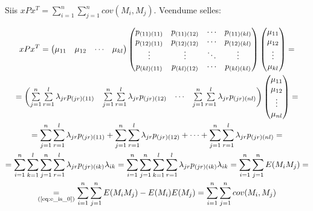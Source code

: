 \documentclass[a4paper,12pt,oneside]{article}
\newenvironment{tightcenter}{%
  \setlength\topsep{0pt}
  \setlength\parskip{0pt}
  \begin{center}
}{%
  \end{center}
}
\numberwithin{equation}{section}
\theoremstyle{definition}
\begin{document}
Siis $xPx^T = \sum \limits_{i=1}^n \sum \limits_{j=1}^n cov(M_i,M_j)$. Veendume selles:
\begin{tightcenter}
\begin{equation*}
\begin{gathered}
xPx^T =
\begin{pmatrix}
\mu_{11} & \mu_{12} & \cdots & \mu_{kl} 
\end{pmatrix}
\begin{pmatrix}
p_{(11)(11)}&p_{(11)(12)}&\cdots&p_{(11)(kl)} \\
p_{(12)(11)}&p_{(12)(12)}&\cdots&p_{(12)(kl)} \\
\vdots&\vdots&\ddots&\vdots \\
p_{(kl)(11)}&p_{(kl)(12)}&\cdots&p_{(kl)(kl)} \\
\end{pmatrix} 
\begin{pmatrix}
\mu_{11} \\
\mu_{12} \\
\vdots \\
\mu_{kl}
\end{pmatrix}
= \\
= 
\begin{pmatrix}
\sum \limits_{j=1}^n \sum \limits_{r=1}^l \lambda_{jr}p_{(jr)(11)} & \sum \limits_{j=1}^n \sum \limits_{r=1}^l \lambda_{jr}p_{(jr)(12)} & \cdots &  \sum \limits_{j=1}^n \sum \limits_{r=1}^l \lambda_{jr}p_{(jr)(nl)} \\
\end{pmatrix}
\begin{pmatrix}
\mu_{11} \\
\mu_{12} \\
\vdots \\
\mu_{nl}
\end{pmatrix}
=\\
=
\sum \limits_{j=1}^n \sum \limits_{r=1}^l \lambda_{jr}p_{(jr)(11)} + \sum \limits_{j=1}^n \sum \limits_{r=1}^l \lambda_{jr}p_{(jr)(12)} + \cdots +  \sum \limits_{j=1}^n \sum \limits_{r=1}^l \lambda_{jr}p_{(jr)(nl)}=\\
= \sum \limits_{i=1}^{n} \sum \limits_{k=1}^{l} \sum \limits_{j=1}^n \sum \limits_{r=1}^l \lambda_{jr}p_{(jr)(ik)} \lambda_{ik} 
= \sum \limits_{i=1}^{n}  \sum \limits_{j=1}^n \sum \limits_{k=1}^{l} \sum \limits_{r=1}^l \lambda_{jr}p_{(jr)(ik)} \lambda_{ik} =
\sum \limits_{i=1}^{n} \sum \limits_{j=1}^n E(M_iM_j) = \\
\underset{\text{(\ref{eq:e_is_0})}}{=} \sum \limits_{i=1}^{n} \sum \limits_{j=1}^n E(M_iM_j) - E(M_i)E(M_j) = \sum \limits_{i=1}^{n} \sum \limits_{j=1}^n cov(M_i,M_j)
\end{gathered}
\end{equation*}
\end{tightcenter}
\end{document}

